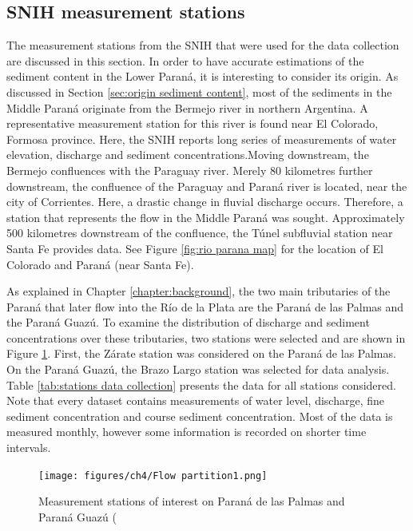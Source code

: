\subsection{SNIH measurement stations}
\label{sec:measurementstations}
The measurement stations from the SNIH that were used for the data collection are discussed in this section. In order to have accurate estimations of the sediment content in the Lower Paraná, it is interesting to consider its origin. As discussed in Section \ref{sec:origin sediment content}, most of the sediments in the Middle Paraná originate from the Bermejo river in northern Argentina. A representative measurement station for this river is found near El Colorado, Formosa province. Here, the SNIH reports long series of measurements of water elevation, discharge and sediment concentrations.Moving downstream, the Bermejo confluences with the Paraguay river. Merely 80 kilometres further downstream, the confluence of the Paraguay and Paraná river is located, near the city of Corrientes. Here, a drastic change in fluvial discharge occurs. Therefore, a station that represents the flow in the Middle Paraná was sought. Approximately 500 kilometres downstream of the confluence, the Túnel subfluvial station near Santa Fe provides data. See Figure \ref{fig:rio parana map} for the location of El Colorado and Paraná (near Santa Fe). 

As explained in Chapter \ref{chapter:background}, the two main tributaries of the Paraná that later flow into the Río de la Plata are the Paraná de las Palmas and the Paraná Guazú. To examine the distribution of discharge and sediment concentrations over these tributaries, two stations were selected and are shown in Figure \ref{fig:flow partition}. First, the Zárate station was considered on the Paraná de las Palmas. On the Paraná Guazú, the Brazo Largo station was selected for data analysis. Table \ref{tab:stations data collection} presents the data for all stations considered. Note that every dataset contains measurements of water level, discharge, fine sediment concentration and course sediment concentration. Most of the data is measured monthly, however some information is recorded on shorter time intervals. 

\begin{figure}[H]
    \centering
    \texttt{[image: figures/ch4/Flow partition1.png]}
    \caption{Measurement stations of interest on Paraná de las Palmas and Paraná Guazú (\autocite{googleGoogleEarth}}
    \label{fig:flow partition}
\end{figure}

